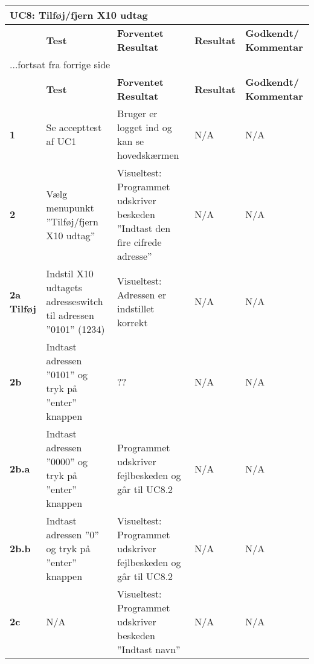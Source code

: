
\begin{center}
\begin{longtable}{|p{}|p{}|p{}|p{}|p{}|} %
\hline
\multicolumn{5}{|l|}{\textbf{UC8: Tilføj/fjern X10 udtag}} \\ \hline
\multicolumn{1}{|c|}{} &
\textbf{Test} &
\textbf{Forventet \newline Resultat} &
\textbf{Resultat} &
\textbf{Godkendt/ \newline Kommentar} \\ \hline 
\endfirsthead

\multicolumn{5}{l}{...fortsat fra forrige side} \\ \hline 
\multicolumn{1}{|c|}{} &
\textbf{Test} &
\textbf{Forventet \newline Resultat} &
\textbf{Resultat} &
\textbf{Godkendt/ \newline Kommentar} \\ \hline 
\endhead


\textbf{1} &
Se accepttest af UC1 &
Bruger er logget ind og kan se hovedskærmen &
N/A &
N/A \\\hline

\textbf{2} &
Vælg menupunkt ''Tilføj/fjern X10 udtag'' &
Visueltest: Programmet udskriver beskeden ''Indtast den fire cifrede adresse'' &
N/A &
N/A \\\hline

\textbf{2a Tilføj} &
Indstil X10 udtagets adresseswitch til adressen ''0101'' (1234) &
Visueltest: Adressen er indstillet korrekt &
N/A &
N/A \\\hline

\textbf{2b} &
Indtast adressen ''0101'' og tryk på ''enter'' knappen &
?? &
N/A &
N/A \\\hline

\textbf{2b.a} &
Indtast adressen ''0000'' og tryk på ''enter'' knappen &
Programmet udskriver fejlbeskeden og går til UC8.2 &
N/A &
N/A \\\hline

\textbf{2b.b} &
Indtast adressen ''0'' og tryk på ''enter'' knappen &
Visueltest: Programmet udskriver fejlbeskeden og går til UC8.2 &
N/A &
N/A \\\hline

\textbf{2c} &
N/A &
Visueltest: Programmet udskriver beskeden ''Indtast navn''&
N/A &
N/A \\\hline


\end{longtable}
\end{center}
